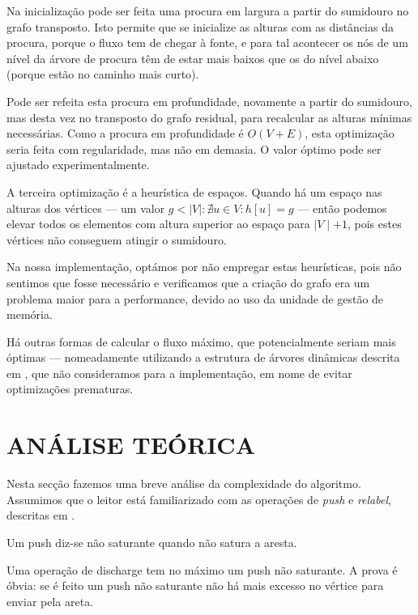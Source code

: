 \documentclass[a4paper, 12pt, conference, portuguese]{ieeeconf}
\begin{document}
Na inicialização pode ser feita uma procura em largura
a partir do sumidouro no grafo transposto. Isto permite que se inicialize
as alturas com as distâncias da procura, porque o fluxo tem de
chegar à fonte, e para tal acontecer os nós de um nível da árvore
de procura têm de estar mais baixos que os do nível abaixo
(porque estão no caminho mais curto).

Pode ser refeita esta procura em profundidade, novamente a partir
do sumidouro, mas desta vez no transposto do grafo residual, para recalcular as
alturas mínimas necessárias. Como a procura em
profundidade é $O(V + E)$, esta optimização seria feita com
regularidade, mas não em demasia. O valor óptimo pode ser
ajustado experimentalmente.

A terceira optimização é a heurística de espaços. Quando há um
espaço nas alturas dos vértices --- um valor $g < \mid V \mid:
\nexists u \in V : h[u] = g$ --- então podemos elevar todos os
elementos com altura superior ao espaço para $\mid V \mid + 1$,
pois estes vértices não conseguem  atingir o
sumidouro.\cite{goldberg}

Na nossa implementação, optámos por não empregar estas
heurísticas, pois não sentimos que fosse necessário e verificamos
que a criação do grafo era um problema maior para a performance,
devido ao uso da unidade de gestão de memória.

Há outras formas de calcular o fluxo máximo, que potencialmente seriam mais óptimas ---
nomeadamente utilizando a estrutura de árvores dinâmicas
descrita em \cite{pre-flow}, que não consideramos para a
implementação, em nome de evitar optimizações prematuras.

\section{ANÁLISE TEÓRICA}\label{theoric}

Nesta secção fazemos uma breve análise da complexidade do
algoritmo. Assumimos que o leitor está familiarizado com as
operações de \textit{push} e \textit{relabel}, descritas em
\cite{pre-flow}.

\begin{defin} 
  Um push diz-se não saturante quando não satura a aresta.
\end{defin}

\begin{lemma} Uma operação de discharge tem no máximo um push não
  saturante. A prova é óbvia: se é feito um push não saturante
  não há mais excesso no vértice para enviar pela areta.
\end{lemma}
\end{document}

